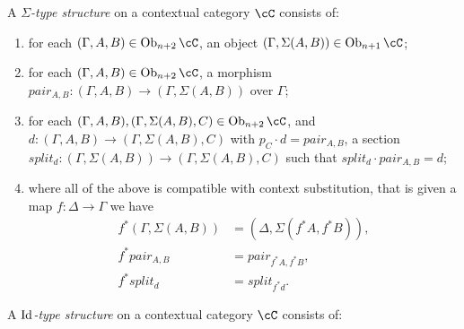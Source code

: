 \documentclass[a4paper,fontsize=12pt]{scrartcl}
\begin{document}
\begin{defn}
  A \emph{$\Sigma$-type structure} on a contextual category $\cC$ consists of:
  \begin{enumerate}
    \item for each $(\Gamma,A,B)\in\Ob_{n+2}\cC$, an object
      $(\Gamma,\Sigma(A,B))\in\Ob_{n+1}\cC$;
    \item for each $(\Gamma,A,B)\in\Ob_{n+2}\cC$, a morphism $pair_{A,B}\colon
      (\Gamma,A,B)\rightarrow(\Gamma,\Sigma(A,B))$ over $\Gamma$;
    \item for each $(\Gamma,A,B),(\Gamma,\Sigma(A,B),C)\in\Ob_{n+2}\cC$, and
      $d\colon(\Gamma,A,B)\rightarrow(\Gamma,\Sigma(A,B),C)$ with $p_C\cdot
      d=pair_{A,B}$, a section
      $split_d\colon(\Gamma,\Sigma(A,B))\rightarrow(\Gamma,\Sigma(A,B),C)$ such
      that $split_d\cdot pair_{A,B}=d$;
    \item where all of the above is compatible with context substitution, that
      is given a map $f\colon\Delta\rightarrow\Gamma$ we have
      \begin{align*}
        f^*(\Gamma,\Sigma(A,B)) &=(\Delta,\Sigma(f^*A,f^*B)), \\
        f^*pair_{A,B} &=pair_{f^*A,f^*B}, \\
        f^*split_d &=split_{f^*d}.
      \end{align*}
  \end{enumerate}
\end{defn}

\begin{defn}
  A \emph{$\operatorname{Id}$-type structure} on a contextual category $\cC$ consists of:
\end{defn}
\end{document}
